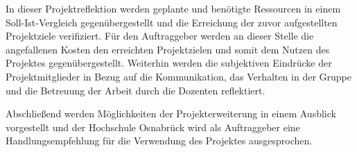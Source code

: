 In dieser Projektreflektion werden geplante und benötigte
Ressourcen in einem Soll-Ist-Vergleich gegenübergestellt und die Erreichung der zuvor
aufgestellten Projektziele verifiziert. Für den Auftraggeber werden an dieser Stelle die
angefallenen Kosten den erreichten Projektzielen und somit dem Nutzen des
Projektes gegenübergestellt. Weiterhin werden die subjektiven Eindrücke der
Projektmitglieder in Bezug auf die Kommunikation, das Verhalten in der Gruppe
und die Betreuung der Arbeit durch die Dozenten reflektiert.

Abschließend werden Möglichkeiten der Projekterweiterung in einem Ausblick vorgestellt
und der Hochschule Osnabrück wird als Auftraggeber eine Handlungsempfehlung für
die Verwendung des Projektes ausgesprochen.
